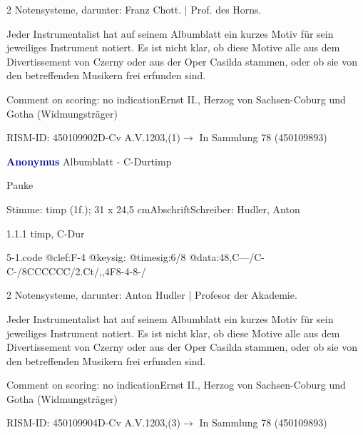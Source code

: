 \documentclass[a4paper, twocolumn, 11pt]{book}
\begin{document}
\newline %
\par 2 Notensysteme, darunter: Franz Chott. | Prof. des Horns.
\par Jeder Instrumentalist hat auf seinem Albumblatt ein kurzes Motiv für sein jeweiliges Instrument notiert. Es ist nicht klar, ob diese Motive alle aus dem {\textquotedbl}Divertissement{\textquotedbl} von Czerny oder aus der Oper {\textquotedbl}Casilda{\textquotedbl} stammen, oder ob sie von den betreffenden Musikern frei erfunden sind.
\par Comment on scoring: no indication\newline Ernst II., Herzog von Sachsen-Coburg und Gotha  (Widmungsträger)
\par RISM-ID: 450109902\newline D-Cv  A.V.1203,(1)\newline $\rightarrow$ In Sammlung 78 (450109893)
      
\par \vspace{16pt} \textcolor{darkblue}{\textbf{Anonymus  }}\hfillplus{[5]}\newline Albumblatt - C-Dur\newline timp
\par \begin{itshape}[heading:] Pauke\end{itshape} 
\par \textcolor{darkblue}{}  Stimme: timp  (1f.); 31 x 24,5 cm\newline Abschrift\newline Schreiber: Hudler, Anton
\par 1.1.1  timp, C-Dur  
\begin{filecontents*}{5-1.code}
@clef:F-4
@keysig:
@timesig:6/8
@data:48,C---/C-C-/{8CCC}{CCC}/2.Ct/,,4F8-4-8-/
\end{filecontents*}

\newline %
\par 2 Notensysteme, darunter: Anton Hudler | Profesor der Akademie.
\par Jeder Instrumentalist hat auf seinem Albumblatt ein kurzes Motiv für sein jeweiliges Instrument notiert. Es ist nicht klar, ob diese Motive alle aus dem {\textquotedbl}Divertissement{\textquotedbl} von Czerny oder aus der Oper {\textquotedbl}Casilda{\textquotedbl} stammen, oder ob sie von den betreffenden Musikern frei erfunden sind.
\par Comment on scoring: no indication\newline Ernst II., Herzog von Sachsen-Coburg und Gotha  (Widmungsträger)
\par RISM-ID: 450109904\newline D-Cv  A.V.1203,(3)\newline $\rightarrow$ In Sammlung 78 (450109893)
      
\end{document}
